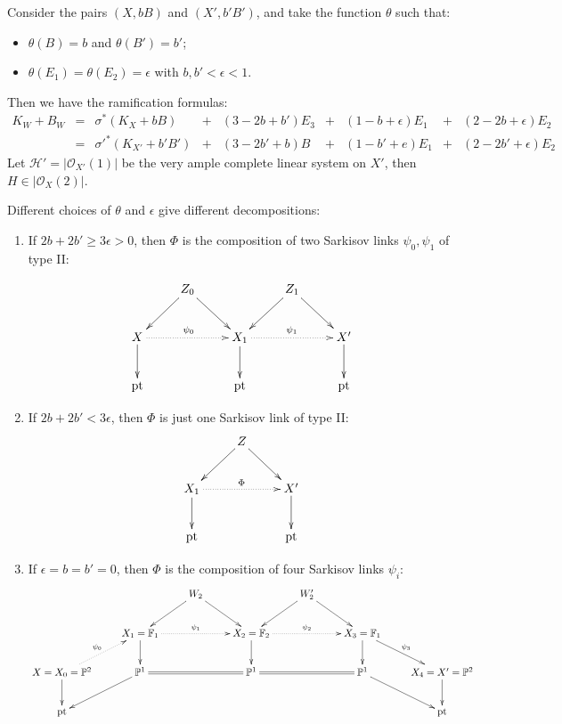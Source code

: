 \documentclass[11pt]{amsart}
\begin{document}
Consider the pairs $ (X,bB) $ and $ (X',b'B') $, and take the function $\theta$ such that:
\begin{itemize}
  \item $\theta(B)=b$ and $\theta(B')=b'$;
  \item $\theta(E_{1})=\theta(E_{2})=\epsilon$ with $b,b'<\epsilon<1$.
\end{itemize}
Then we have the ramification formulas:
\[ \begin{array}{rllllllllll}
    K_W+B_W & = & \sigma^*(K_X+bB)       & + & (3-2b+b')E_3 & + & (1-b+\epsilon)E_1 & + & (2-2b+\epsilon)E_2  & \\
            & = & \sigma'^*(K_{X'}+b'B') & + & (3-2b'+b)B   & + & (1-b'+e)E_1       & + & (2-2b'+\epsilon)E_2 &
  \end{array} \]
Let $ \mathcal{H}'=|\mathcal{O}_{X'}(1)| $ be the very ample complete linear system on $X'$, then $H\in |\mathcal{O}_{X}(2)|$. 

Different choices of $\theta$ and  $\epsilon$ give different decompositions:
\begin{enumerate}
  \item\label{example1.1} If $ 2b+2b'\geqslant 3\epsilon>0 $, then $\Phi$ is the composition of two Sarkisov links $\psi_{0},\psi_{1}$ of type II:

  \[
    \xymatrix{
    &Z_{0}\ar[rd]\ar[ld] & &Z_{1}\ar[rd]\ar[ld]\\
    X\ar[d]\ar@{.>}[rr]^{\psi_{0}}& &X_{1}\ar@{.>}[rr]^{\psi_{1}}\ar[d]&&X'\ar[d]\\
    \text{pt}&&\text{pt}&&\text{pt}
    }
  \]
  \item If $ 2b+2b'< 3\epsilon $, then $\Phi$ is just one Sarkisov link  of type II:
        \[
          \xymatrix{
            &Z\ar[rd]\ar[ld] & \\
            X_{1}\ar@{.>}[rr]^{\Phi}\ar[d]& &X'\ar[d]\\
            \text{pt}&&\text{pt}
          }
        \]
  \item If $ \epsilon=b=b'=0 $, then $\Phi$ is the composition of four Sarkisov links $\psi_{i}$:
        \[ \xymatrix{
          &&W_2\ar[ld]\ar[rd]&&W_2'\ar[ld]\ar[rd]\\
          &X_1=\mathbb{F}_1\ar@{.>}[rr]^{\psi_{1}}\ar[d]&&X_2=\mathbb{F}_2\ar@{.>}[rr]^{\psi_{2}}\ar[d]&&X_3=\mathbb{F}_1\ar[d]\ar[rd]^{\psi_{3}}\\
          X=X_0=\mathbb{P}^2\ar[d]\ar@{.>}[ru]^{\psi_{0}}&\mathbb{P}^1\ar[ld]\ar@{=}[rr]&&\mathbb{P}^1\ar@{=}[rr]&&\mathbb{P}^1\ar[rd]&X_4=X'=\mathbb{P}^2\ar[d]\\
          \text{pt}&&&&&&\text{pt} } \]
\end{enumerate}
\end{document}
